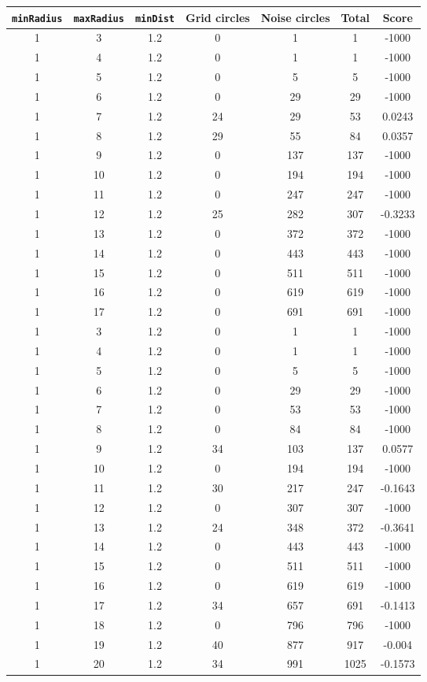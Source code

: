 \documentclass[letterpaper, 12pt]{article}
\begin{document}
\begin{longtable}{|c|c|c|c|c|c|c|}
\hline
\textbf{\texttt{minRadius}} & \textbf{\texttt{maxRadius}} & \textbf{\texttt{minDist}} & \textbf{Grid circles} & \textbf{Noise circles} & \textbf{Total} & \textbf{Score} \\
\hline
1 & 3 & 1.2 & 0 & 1 & 1 & -1000 \\
\hline
1 & 4 & 1.2 & 0 & 1 & 1 & -1000 \\
\hline
1 & 5 & 1.2 & 0 & 5 & 5 & -1000 \\
\hline
1 & 6 & 1.2 & 0 & 29 & 29 & -1000 \\
\hline
1 & 7 & 1.2 & 24 & 29 & 53 & 0.0243 \\
\hline
1 & 8 & 1.2 & 29 & 55 & 84 & 0.0357 \\
\hline
1 & 9 & 1.2 & 0 & 137 & 137 & -1000 \\
\hline
1 & 10 & 1.2 & 0 & 194 & 194 & -1000 \\
\hline
1 & 11 & 1.2 & 0 & 247 & 247 & -1000 \\
\hline
1 & 12 & 1.2 & 25 & 282 & 307 & -0.3233 \\
\hline
1 & 13 & 1.2 & 0 & 372 & 372 & -1000 \\
\hline
1 & 14 & 1.2 & 0 & 443 & 443 & -1000 \\
\hline
1 & 15 & 1.2 & 0 & 511 & 511 & -1000 \\
\hline
1 & 16 & 1.2 & 0 & 619 & 619 & -1000 \\
\hline
1 & 17 & 1.2 & 0 & 691 & 691 & -1000 \\
\hline
1 & 3 & 1.2 & 0 & 1 & 1 & -1000 \\
\hline
1 & 4 & 1.2 & 0 & 1 & 1 & -1000 \\
\hline
1 & 5 & 1.2 & 0 & 5 & 5 & -1000 \\
\hline
1 & 6 & 1.2 & 0 & 29 & 29 & -1000 \\
\hline
1 & 7 & 1.2 & 0 & 53 & 53 & -1000 \\
\hline
1 & 8 & 1.2 & 0 & 84 & 84 & -1000 \\
\hline
1 & 9 & 1.2 & 34 & 103 & 137 & 0.0577 \\
\hline
1 & 10 & 1.2 & 0 & 194 & 194 & -1000 \\
\hline
1 & 11 & 1.2 & 30 & 217 & 247 & -0.1643 \\
\hline
1 & 12 & 1.2 & 0 & 307 & 307 & -1000 \\
\hline
1 & 13 & 1.2 & 24 & 348 & 372 & -0.3641 \\
\hline
1 & 14 & 1.2 & 0 & 443 & 443 & -1000 \\
\hline
1 & 15 & 1.2 & 0 & 511 & 511 & -1000 \\
\hline
1 & 16 & 1.2 & 0 & 619 & 619 & -1000 \\
\hline
1 & 17 & 1.2 & 34 & 657 & 691 & -0.1413 \\
\hline
1 & 18 & 1.2 & 0 & 796 & 796 & -1000 \\
\hline
1 & 19 & 1.2 & 40 & 877 & 917 & -0.004 \\
\hline
1 & 20 & 1.2 & 34 & 991 & 1025 & -0.1573 \\
\hline
\end{longtable}
\end{document}
